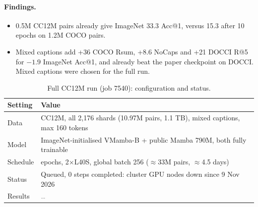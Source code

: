 \documentclass[a4paper,10pt]{article}
\newcommand{\tbd}{\textcolor{gray}{\ldots}}
\begin{document}
\paragraph{Findings.}
\begin{itemize}
  \item 0.5M CC12M pairs already give ImageNet 33.3 Acc@1, versus 15.3 after 10 epochs on 1.2M COCO pairs.
  \item Mixed captions add +36 COCO Rsum, +8.6 NoCaps and +21 DOCCI R@5 for $-1.9$ ImageNet Acc@1, and already beat the paper checkpoint on DOCCI. Mixed captions were chosen for the full run.
\end{itemize}

\begin{table}[!htbp]
\centering
\caption{Full CC12M run (job 7540): configuration and status.}
\label{tab:cc12m-full}
\begin{tabular}{l>{\raggedright\arraybackslash}p{11cm}}
\toprule
Setting & Value \\
\midrule
Data     & CC12M, all 2,176 shards (10.97M pairs, 1.1 TB), mixed captions, max 160 tokens \\
Model    & ImageNet-initialised VMamba-B + public Mamba 790M, both fully trainable \\
Schedule & 3 epochs, 2$\times$L40S, global batch 256 ($\approx$33M pairs, $\approx$4.5 days) \\
Status   & Queued, 0 steps completed: cluster GPU nodes down since 9 Nov 2026 \\
Results  & \tbd \\
\bottomrule
\end{tabular}
\end{table}
\end{document}
